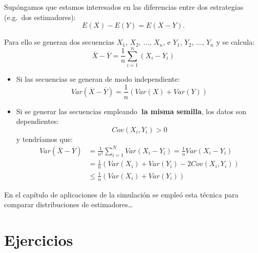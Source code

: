 \documentclass[
  10pt,
]{book}
\theoremstyle{break}
\theoremstyle{nonumberplain}
\begin{document}
Supóngamos que estamos interesados en las diferencias entre dos
estrategias (e.g.~dos estimadores):
\[E\left(  X\right)  -E\left(  Y\right)  =E\left(  X-Y\right).\]

Para ello se generan dos secuencias \(X_{1}\), \(X_{2}\), \(\ldots\),
\(X_{n}\), e \(Y_{1}\), \(Y_{2}\), \(\ldots\), \(Y_{n}\) y se calcula:
\[\overline{X}-\overline{Y}=\frac{1}{n}\sum_{i=1}^{n}\left(  X_{i}-Y_{i}\right)\]

\begin{itemize}
\item
  Si las secuencias se generan de modo independiente:
  \[Var\left( \overline{X} - \overline{Y} \right) 
  = \frac{1}{n} \left( Var\left( X \right) + Var\left( Y \right) \right)\]
\item
  Si se generar las secuencias empleando\textbf{~la misma semilla},
  los datos son dependientes:
  \[Cov\left( X_{i}, Y_{i} \right) > 0\]
  y tendríamos que:
  \[\begin{aligned}
  Var\left( \overline{X}-\overline{Y}\right)  &
  = \frac{1}{n^{2}}\sum_{i=1}^{N}Var\left( X_{i}-Y_{i}\right) 
  = \frac{1}{n}Var\left( X_{i}-Y_{i}\right) \\
  & = \frac{1}{n}\left( Var\left( X_{i} \right) + Var\left( Y_{i} \right)
  - 2Cov\left( X_{i},Y_{i} \right) \right) \\
  & \leq \frac{1}{n}\left( Var\left( X_{i} \right) 
  + Var\left( Y_{i}\right) \right)
  \end{aligned}\]
\end{itemize}

En el capítulo de aplicaciones de la simulación se empleó esta técnica para comparar distribuciones de estimadores\ldots{}

\hypertarget{ejercicios-2}{%
\section{Ejercicios}\label{ejercicios-2}}
\end{document}
